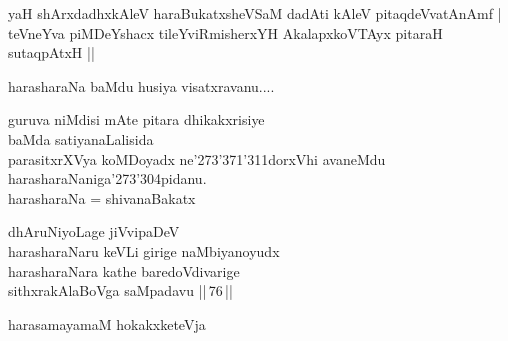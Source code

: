 \begin{entry}
\begin{shl}
yaH shArxdadhxkAleV haraBukatxsheVSaM dadAti kAleV pitaqdeVvatAnAmf |\\
teVneYva piMDeYshacx tileYviRmisherxYH AkalapxkoVTAyx pitaraH sutaqpAtxH ||
\end{shl}
\end{entry}

\begin{entry}
\gl{}
\begin{shl}
harasharaNa baMdu husiya visatxravanu....
\end{shl}
\begin{shl}
guruva niMdisi mAte pitara dhikakxrisiye\\
baMda satiyanaLalisida\\
parasitxrXVya koMDoyadx ne\char'273\char'371\char'311dorxVhi
avaneMdu\\
harasharaNaniga\char'273\char'304pidanu.\\
harasharaNa = shivanaBakatx
\end{shl}
\gl{}
\begin{shl}
dhAruNiyoLage jiVvipaDeV\\
harasharaNaru keVLi girige naMbiyanoyudx\\
harasharaNara kathe baredoVdivarige\\
sithxrakAlaBoVga saMpadavu ||\,76\,||
\end{shl}
\end{entry}

\begin{entry}
\gl{}
\begin{shl}
harasamayamaM hokakxketeVja
\end{shl}
\end{entry}

\begin{entry}
\end{entry}

